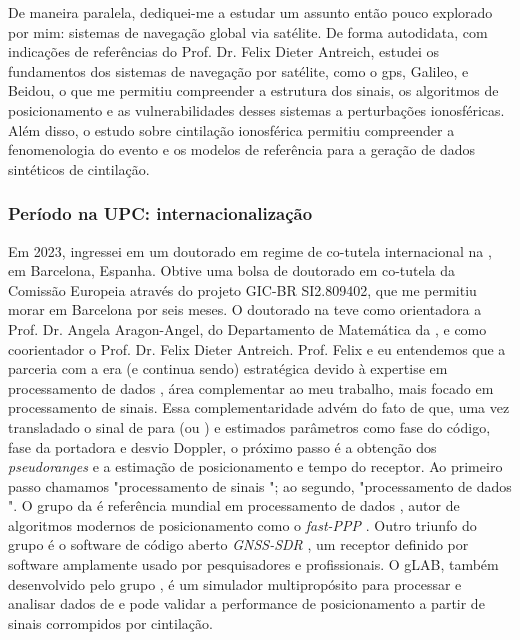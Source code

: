 \documentclass{article}
\begin{document}
De maneira paralela, dediquei-me a estudar um assunto então pouco explorado por mim: sistemas de navegação global via satélite. De forma autodidata, com indicações de referências do Prof. Dr. Felix Dieter Antreich, estudei os fundamentos dos sistemas de navegação por satélite, como o \gls{gps}, Galileo,  e Beidou, o que me permitiu compreender a estrutura dos sinais, os algoritmos de posicionamento e as vulnerabilidades desses sistemas a perturbações ionosféricas. Além disso, o estudo sobre cintilação ionosférica permitiu compreender a fenomenologia do evento e os modelos de referência para a geração de dados sintéticos de cintilação.

\subsubsection{Período na UPC: internacionalização}

Em 2023, ingressei em um doutorado em regime de co-tutela internacional na , em Barcelona, Espanha. Obtive uma bolsa de doutorado em co-tutela da Comissão Europeia através do projeto GIC-BR SI2.809402, que me permitiu morar em Barcelona por seis meses. O doutorado na  teve como orientadora a Prof. Dr. Angela Aragon-Angel, do Departamento de Matemática da , e como coorientador o Prof. Dr. Felix Dieter Antreich. Prof. Felix e eu entendemos que a parceria com a  era (e continua sendo) estratégica devido à expertise em processamento de dados , área complementar ao meu trabalho, mais focado em processamento de sinais. Essa complementaridade advém do fato de que, uma vez transladado o sinal de  para  (ou ) e estimados parâmetros como fase do código, fase da portadora e desvio Doppler, o próximo passo é a obtenção dos \textit{pseudoranges} e a estimação de posicionamento e tempo do receptor. Ao primeiro passo chamamos "processamento de sinais "; ao segundo, "processamento de dados ". O grupo  da  é referência mundial em processamento de dados , autor de algoritmos modernos de posicionamento como o \textit{fast-PPP} \cite{rovira-garciaFastPrecisePoint2016}. Outro triunfo do grupo é o software de código aberto \textit{GNSS-SDR} \cite{fernandez-pradesGNSSSDROpenSource2011}, um receptor  definido por software amplamente usado por pesquisadores e profissionais. O gLAB, também desenvolvido pelo grupo , é um simulador multipropósito para processar e analisar dados de  e pode validar a performance de posicionamento a partir de sinais corrompidos por cintilação.
\end{document}
